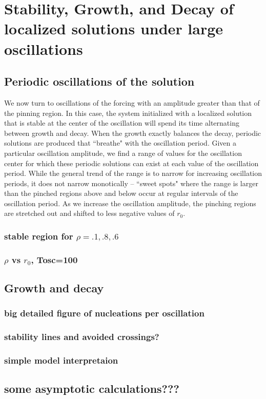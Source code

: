 \documentclass[../main/TimeForcingSHE.tex]{subfiles}
\begin{document}
\section{Stability, Growth, and Decay of localized solutions under large oscillations }
\subsection{Periodic oscillations of the solution}

We now turn to oscillations of the forcing with an amplitude greater than that of the pinning region.   In this case, the system  initialized with a localized solution that is stable at the center of the oscillation will spend its time alternating between growth and decay.  When the growth exactly balances the decay, periodic solutions are produced that ``breathe" with the oscillation period. Given a particular oscillation amplitude, we find a range of values for the oscillation center for which these periodic solutions can exist at each value of the oscillation period.  While the general trend of the range is to narrow for increasing oscillation periods, it does not narrow monotically -- ``sweet spots" where the range is larger than the pinched regions above and below occur at regular intervals of the oscillation period.  As we increase the oscillation amplitude, the  pinching regions are stretched out and shifted to less negative values of $r_0$.  

\FIGvcmcompare


	\subsubsection{stable region for $\rho=.1,.8,.6$}
	\subsubsection{$\rho$ vs $r_0$, Tosc=100}

\subsection{Growth and decay}
	\subsubsection{big detailed figure of nucleations per oscillation}
	\subsubsection{stability lines and avoided crossings?}
	\subsubsection{simple model interpretaion}

\subsection{some asymptotic calculations???}
\end{document}
